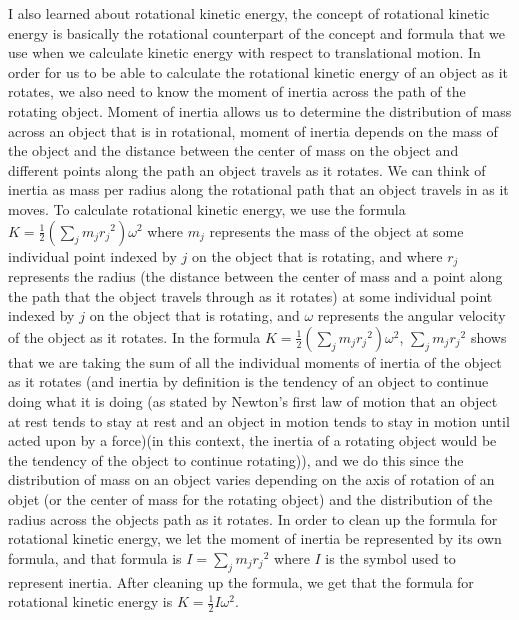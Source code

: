 \documentclass{turabian-researchpaper}
\begin{document}
I also learned about rotational kinetic energy, the concept of rotational kinetic energy is basically the rotational counterpart of the concept and formula that we use when we calculate kinetic energy with respect to translational motion. In order for us to be able to calculate the rotational kinetic energy of an object as it rotates, we also need to know the moment of inertia across the path of the rotating object. Moment of inertia allows us to determine the distribution of mass across an object that is in rotational, moment of inertia depends on the mass of the object and the distance between the center of mass on the object and different points along the path an object travels as it rotates. We can think of inertia as mass per radius along the rotational path that an object travels in as it moves. To calculate rotational kinetic energy, we use the formula $K = \frac{1}{2}\left({\displaystyle\sum_{j}m_j}{r_j}^2\right)\omega^2$ where \(m_j\) represents the mass of the object at some individual point indexed by \(j\) on the object that is rotating, and where \(r_j\) represents the radius (the distance between the center of mass and a point along the path that the object travels through as it rotates) at some individual point indexed by \(j\) on the object that is rotating, and \(\omega\) represents the angular velocity of the object as it rotates. In the formula $K = \frac{1}{2}\left({\displaystyle\sum_{j}m_j}{r_j}^2\right)\omega^2$, $\displaystyle\sum_{j}m_j{r_j}^2$ shows that we are taking the sum of all the individual moments of inertia of the object as it rotates (and inertia by definition is the tendency of an object to continue doing what it is doing (as stated by Newton's first law of motion that an object at rest tends to stay at rest and an object in motion tends to stay in motion until acted upon by a force)(in this context, the inertia of a rotating object would be the tendency of the object to continue rotating)), and we do this since the distribution of mass on an object varies depending on the axis of rotation of an objet (or the center of mass for the rotating object) and the distribution of the radius across the objects path as it rotates. In order to clean up the formula for rotational kinetic energy, we let the moment of inertia be represented by its own formula, and that formula is $I = \displaystyle\sum_{j}m_j{r_j}^2$ where $I$ is the symbol used to represent inertia. After cleaning up the formula, we get that the formula for rotational kinetic energy is $K = \displaystyle{\frac{1}{2}{I{\omega^2}}}$. \\     
\end{document}
